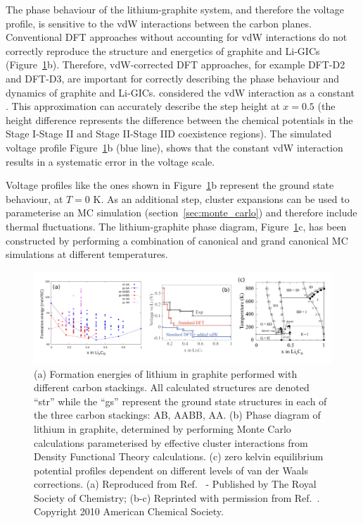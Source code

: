 \documentclass[../main.tex]{subfiles}
\begin{document}
The phase behaviour of the lithium-graphite system, and therefore the voltage profile, is sensitive to the vdW interactions between the carbon planes.\cite{thinius2014theoretical, Hakim,persson2010} Conventional DFT approaches without accounting for vdW interactions do not correctly reproduce the structure and energetics of graphite and Li-GICs \cite{thinius2014theoretical, Hakim,persson2010} (Figure~\ref{fig:persson_graphitephases}b). Therefore, vdW-corrected DFT approaches, for example DFT-D2\cite{Grimme-1} and DFT-D3\cite{Grimme-3}, are important for correctly describing the phase behaviour and dynamics of graphite and Li-GICs. \citeauthor{persson2010} considered the vdW interaction as a constant \cite{persson2010}. This approximation can accurately describe the step height at $x=0.5$ (the height difference represents the difference between the chemical potentials in the Stage I-Stage II and Stage II-Stage IID coexistence regions). The simulated voltage profile Figure~\ref{fig:persson_graphitephases}b (blue line), shows that the constant vdW interaction results in a systematic error in the voltage scale.

Voltage profiles like the ones shown in Figure~\ref{fig:persson_graphitephases}b represent the ground state behaviour, at $T = 0$ K. As an additional step, cluster expansions can be used to parameterise an MC simulation (section~\ref{sec:monte_carlo}) and therefore include thermal fluctuations. The lithium-graphite phase diagram, Figure~\ref{fig:persson_graphitephases}c, has been constructed by performing a combination of canonical and grand canonical MC simulations at different temperatures. \cite{persson2010}

\begin{figure}
    \centering
    \includegraphics[scale=0.45]{figures/cluster_expansions_persson.png}
    \caption{(a) Formation energies of lithium in graphite performed with different carbon stackings. All calculated structures are denoted ``str'' while the ``gs'' represent the ground state structures in each of the three carbon stackings: AB, AABB, AA. (b) Phase diagram of lithium in graphite, determined by performing Monte Carlo calculations parameterised by effective cluster interactions from Density Functional Theory calculations. (c) zero kelvin equilibrium potential profiles dependent on different levels of van der Waals corrections. (a) Reproduced from Ref.~ - Published by The Royal Society of Chemistry; (b-c) Reprinted with permission from Ref.~. Copyright 2010 American Chemical Society.}
    \label{fig:persson_graphitephases}
\end{figure}
\end{document}
